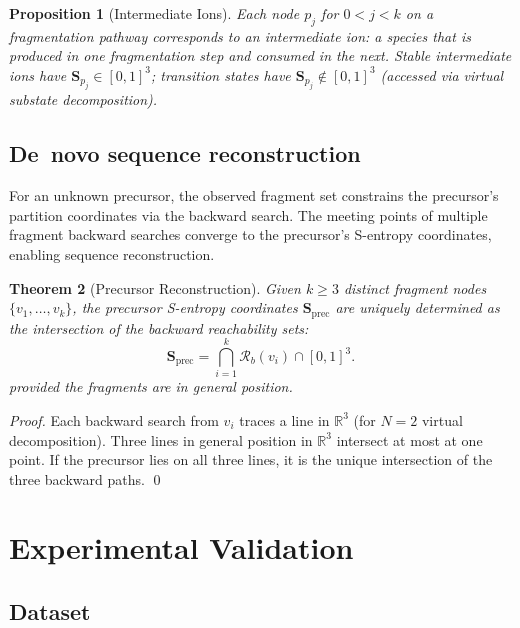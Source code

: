 \documentclass[twocolumn,10pt,a4paper]{article}
\theoremstyle{thmstyle}
\newtheorem{theorem}{Theorem}[section]
\newtheorem{proposition}[theorem]{Proposition}
\theoremstyle{definition}
\theoremstyle{remark}
\newcommand{\R}{\mathbb{R}}
\newcommand{\Sv}{\mathbf{S}}
\newcommand{\Reachb}{\mathcal{R}_b}
\begin{document}
\begin{proposition}[Intermediate Ions]
\label{prop:intermediate}
Each node $p_j$ for $0 < j < k$ on a fragmentation pathway corresponds
to an intermediate ion: a species that is produced in one fragmentation
step and consumed in the next. Stable intermediate ions have
$\Sv_{p_j} \in [0,1]^3$; transition states have
$\Sv_{p_j} \notin [0,1]^3$ (accessed via virtual substate decomposition).
\end{proposition}

\subsection{De~novo sequence reconstruction}

For an unknown precursor, the observed fragment set constrains the
precursor's partition coordinates via the backward search. The meeting
points of multiple fragment backward searches converge to the precursor's
S-entropy coordinates, enabling sequence reconstruction.

\begin{theorem}[Precursor Reconstruction]
\label{thm:reconstruction}
Given $k \geq 3$ distinct fragment nodes $\{v_1, \ldots, v_k\}$, the
precursor S-entropy coordinates $\Sv_\text{prec}$ are uniquely determined
as the intersection of the backward reachability sets:
\begin{equation}
\Sv_\text{prec} = \bigcap_{i=1}^{k} \Reachb(v_i) \cap [0,1]^3.
\end{equation}
provided the fragments are in general position.
\end{theorem}

\begin{proof}
Each backward search from $v_i$ traces a line in $\R^3$ (for $N=2$
virtual decomposition). Three lines in general position in $\R^3$
intersect at most at one point. If the precursor lies on all three
lines, it is the unique intersection of the three backward paths.
\qed
\end{proof}

\section{Experimental Validation}
\label{sec:validation}

\subsection{Dataset}
\end{document}
